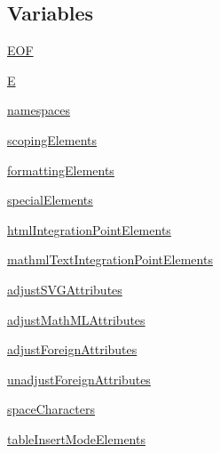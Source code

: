 \subsection*{Variables}
\begin{DoxyCompactItemize}
\item 
\hyperlink{namespacepip_1_1__vendor_1_1html5lib_1_1constants_ad75efad4dbf97ae0f3e9a98e68bc8263}{E\+OF}
\item 
\hyperlink{namespacepip_1_1__vendor_1_1html5lib_1_1constants_af73f915bb193e899afc338b08e49675e}{E}
\item 
\hyperlink{namespacepip_1_1__vendor_1_1html5lib_1_1constants_a090a5aff19816b90b6b69810c7a6c481}{namespaces}
\item 
\hyperlink{namespacepip_1_1__vendor_1_1html5lib_1_1constants_a1b9045f5fc82e52a5427b20cb89b9a71}{scoping\+Elements}
\item 
\hyperlink{namespacepip_1_1__vendor_1_1html5lib_1_1constants_a99e56b729558c673cfdb80bf75004f8c}{formatting\+Elements}
\item 
\hyperlink{namespacepip_1_1__vendor_1_1html5lib_1_1constants_a27b93bb18d90c788fde18715324fe004}{special\+Elements}
\item 
\hyperlink{namespacepip_1_1__vendor_1_1html5lib_1_1constants_afea454a6362610786da5d9febb05c0f0}{html\+Integration\+Point\+Elements}
\item 
\hyperlink{namespacepip_1_1__vendor_1_1html5lib_1_1constants_a3517bda468060223696714fdbd45a09b}{mathml\+Text\+Integration\+Point\+Elements}
\item 
\hyperlink{namespacepip_1_1__vendor_1_1html5lib_1_1constants_ae6021fab73150e5ca1d7d9d0cb563812}{adjust\+S\+V\+G\+Attributes}
\item 
\hyperlink{namespacepip_1_1__vendor_1_1html5lib_1_1constants_adfe34fd791f1908ae9700d40d28ff867}{adjust\+Math\+M\+L\+Attributes}
\item 
\hyperlink{namespacepip_1_1__vendor_1_1html5lib_1_1constants_a01979784511feacc701600345de15ed8}{adjust\+Foreign\+Attributes}
\item 
\hyperlink{namespacepip_1_1__vendor_1_1html5lib_1_1constants_af1d96cee309d2fce80cc09651ea4e0ef}{unadjust\+Foreign\+Attributes}
\item 
\hyperlink{namespacepip_1_1__vendor_1_1html5lib_1_1constants_aec6d2723800a20d3ccc83ddc4675fb3f}{space\+Characters}
\item 
\hyperlink{namespacepip_1_1__vendor_1_1html5lib_1_1constants_a3044ebe9a4a04f45232c2ff1feccc7cb}{table\+Insert\+Mode\+Elements}
\item 

\end{DoxyCompactItemize}
